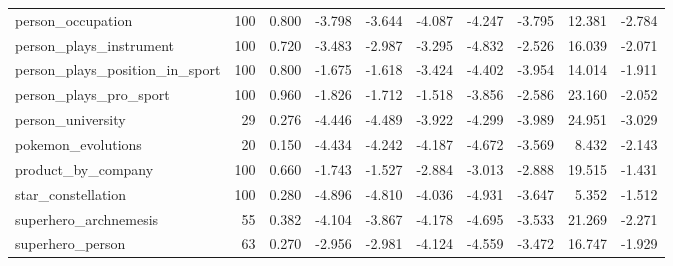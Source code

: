 \begin{table}[htbp]
{\begin{tabular}{lrrrrrrrrr}
person\_occupation & 100 & 0.800 & -3.798 & -3.644 & -4.087 & -4.247 & -3.795 & 12.381 & -2.784 \\
person\_plays\_instrument & 100 & 0.720 & -3.483 & -2.987 & -3.295 & -4.832 & -2.526 & 16.039 & -2.071 \\
person\_plays\_position\_in\_sport & 100 & 0.800 & -1.675 & -1.618 & -3.424 & -4.402 & -3.954 & 14.014 & -1.911 \\
person\_plays\_pro\_sport & 100 & 0.960 & -1.826 & -1.712 & -1.518 & -3.856 & -2.586 & 23.160 & -2.052 \\
person\_university & 29 & 0.276 & -4.446 & -4.489 & -3.922 & -4.299 & -3.989 & 24.951 & -3.029 \\
pokemon\_evolutions & 20 & 0.150 & -4.434 & -4.242 & -4.187 & -4.672 & -3.569 & 8.432 & -2.143 \\
product\_by\_company & 100 & 0.660 & -1.743 & -1.527 & -2.884 & -3.013 & -2.888 & 19.515 & -1.431 \\
star\_constellation & 100 & 0.280 & -4.896 & -4.810 & -4.036 & -4.931 & -3.647 & 5.352 & -1.512 \\
superhero\_archnemesis & 55 & 0.382 & -4.104 & -3.867 & -4.178 & -4.695 & -3.533 & 21.269 & -2.271 \\
superhero\_person & 63 & 0.270 & -2.956 & -2.981 & -4.124 & -4.559 & -3.472 & 16.747 & -1.929 \\
\bottomrule
\end{tabular}}
\end{table}
